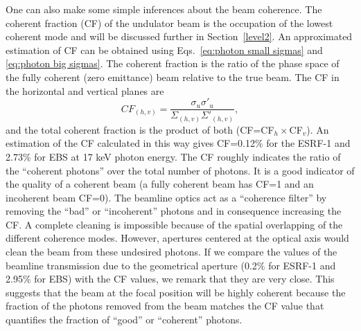 \documentclass{iucr}              %
\begin{document}
One can also make some simple inferences about the beam coherence. The coherent fraction (CF) \cite{arxivCF} of the undulator beam is the occupation of the lowest coherent mode and will be discussed further in Section~\ref{level2}. An approximated estimation of CF can be obtained using Eqs.~\ref{eq:photon small sigmas} and \ref{eq:photon big sigmas}. The coherent fraction is the ratio of the phase space of the fully coherent (zero emittance) beam relative to the true beam. The CF in the horizontal and vertical planes are
\begin{equation}\label{eq:coherent fraction}
 CF_{(h,v)} = \frac{\sigma_u \sigma'_u}{\Sigma_{(h,v)} \Sigma'_{(h,v)}},
\end{equation}
and the total coherent fraction is the product of both (CF=CF$_h \times $CF$_v$). An estimation of the CF calculated in this way gives CF=0.12\% for the ESRF-1 and 2.73\% for EBS at 17 keV photon energy. The CF roughly indicates the ratio of the ``coherent photons'' over the total number of photons. It is a good indicator of the quality of a coherent beam (a fully coherent beam has CF=1 and an incoherent beam CF=0). The beamline optics act as a ``coherence filter'' by removing the ``bad'' or ``incoherent'' photons and in consequence increasing the CF. A complete cleaning is impossible because of the spatial overlapping of the different coherence modes. However, apertures centered at the optical axis would clean the beam from these undesired photons. If we compare the values of the beamline transmission due to the geometrical aperture  (0.2\% for ESRF-1 and 2.95\% for EBS) with the CF values, we remark that they are very close. This suggests that the beam at the focal position will be highly coherent because the fraction of the photons removed from the beam matches the CF value that quantifies the fraction of ``good'' or ``coherent'' photons. 
\end{document}
